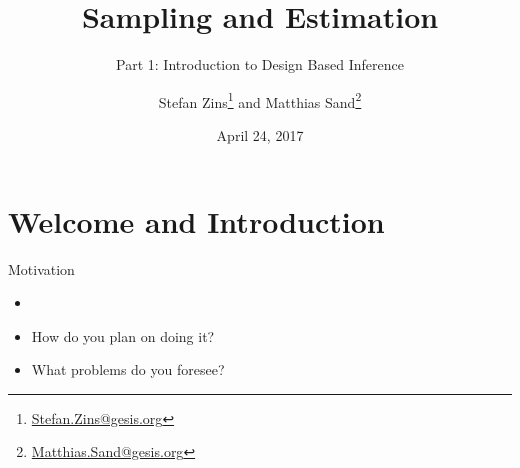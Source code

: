 \documentclass[10pt]{beamer}\usepackage[]{graphicx}\usepackage[]{color}
\newcommand\makebeamertitle{\frame{\maketitle}}%
\begin{document}




\title[Sampling Designs]{Sampling and Estimation}   
\subtitle{Part 1: Introduction to Design Based Inference}

\author{Stefan Zins\thanks{\href{mailto:Stefan.Zins@gesis.org}{Stefan.Zins@gesis.org}} and Matthias Sand\thanks{\href{mailto:Matthias.Sand@gesis.org}{Matthias.Sand@gesis.org}}}
\date{April 24, 2017} 

\makebeamertitle

\section{Welcome and Introduction}


\begin{frame}{Motivation}

  \begin{itemize}
    \item<1-2,3->  
         \vspace{1cm}
    \item<3-> How do you plan on doing it?  \vspace{1cm}
    \item<4>  What problems do you foresee?
  \end{itemize}
\end{frame}
\end{document}
